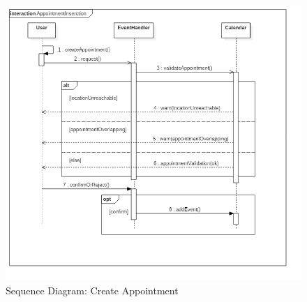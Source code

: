 \begin{figure}
	\centering
	\includegraphics[width=6in]{./diagrams/AppointmentInserction.png}
	\caption{Sequence Diagram: Create Appointment}
	\label{fig:SequenceAddApp}
\end{figure}



